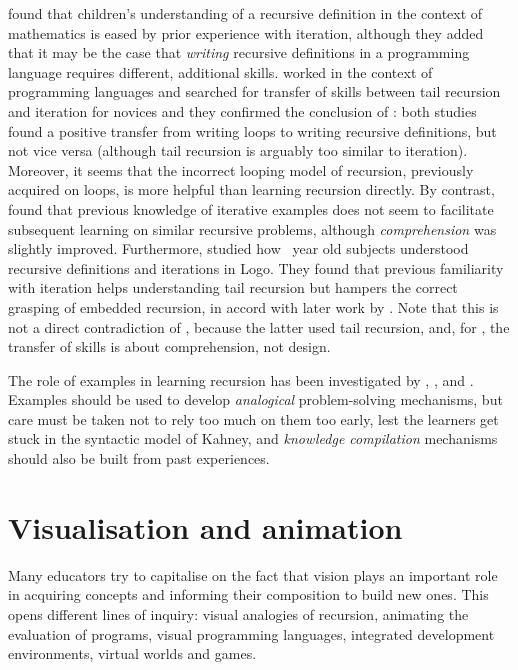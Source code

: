 \documentclass[11pt,a4paper]{article}
\newcommand\plang[1]{\textsf{#1}\xspace}
\begin{document}
\textcite{AnzaiUesato:1982} found that children's understanding of a
recursive definition in the context of mathematics is eased by prior
experience with iteration, although they added that it may be the case
that \emph{writing} recursive definitions in a programming language
requires different, additional skills. \textcite{KesslerAnderson:1986}
worked in the context of programming languages and searched for
transfer of skills between tail recursion and iteration for novices
and they confirmed the conclusion of \textcite{AnzaiUesato:1982}: both
studies found a positive transfer from writing loops to writing
recursive definitions, but not vice versa (although tail recursion is
arguably too similar to iteration). Moreover, it seems that the
incorrect looping model of recursion, previously acquired on loops, is
more helpful than learning recursion directly. By contrast,
\textcite{Wiedenbeck:1988} found that previous knowledge of iterative
examples does not seem to facilitate subsequent learning on similar
recursive problems, although \emph{comprehension} was slightly
improved. Furthermore, \textcite{KurlandPea:1985} studied how
~year old subjects understood recursive definitions
and iterations in \plang{Logo}. They found that previous familiarity
with iteration helps understanding tail recursion but hampers the
correct grasping of embedded recursion, in accord with later work by
\textcite{Murnane:1992}. Note that this is not a direct contradiction
of \textcite{KesslerAnderson:1986}, because the latter used tail
recursion, and, for \textcite{Wiedenbeck:1988}, the transfer of skills
is about comprehension, not design.

The role of examples in learning recursion has been investigated by
\textcite{PirolliAnderson:1985}, \textcite{Wiedenbeck:1989},
\textcite{Pirolli:1991} and
\textcite{TasconRinderknechtKimKim:2010}. Examples should be used to
develop \emph{analogical} problem\hyp{}solving mechanisms, but care
must be taken not to rely too much on them too early, lest the
learners get stuck in the syntactic model of Kahney, and
\emph{knowledge compilation} mechanisms should also be built from past
experiences.

\section{Visualisation and animation}

Many educators try to capitalise on the fact that vision plays an
important role in acquiring concepts and informing their composition
to build new ones. This opens different lines of inquiry: visual
analogies of recursion, animating the evaluation of programs, visual
programming languages, integrated development environments, virtual
worlds and games.
\end{document}
